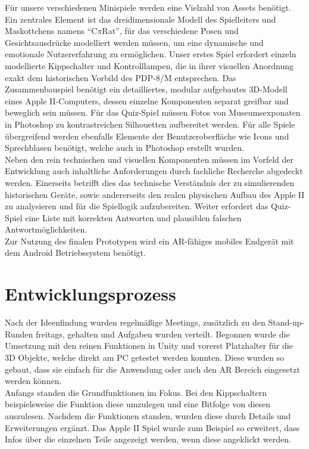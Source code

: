 Für unsere verschiedenen Minispiele werden eine Vielzahl von Assets benötigt. Ein zentrales Element ist das dreidimensionale Modell des Spielleiters und Maskottchens namens “C$\pi$Rat”, für das verschiedene Posen und Gesichtsausdrücke modelliert werden müssen, um eine dynamische und emotionale Nutzererfahrung zu ermöglichen. Unser erstes Spiel erfordert einzeln modellierte Kippschalter und Kontrolllampen, die in ihrer visuellen Anordnung exakt dem historischen Vorbild des PDP-8/M entsprechen. Das Zusammenbauspiel benötigt ein detailliertes, modular aufgebautes 3D-Modell eines Apple II-Computers, dessen einzelne Komponenten separat greifbar und beweglich sein müssen. Für das Quiz-Spiel müssen Fotos von Museumsexponaten in Photoshop zu kontrastreichen Silhouetten aufbereitet werden. Für alle Spiele übergreifend werden ebenfalls Elemente der Benutzeroberfläche wie Icons und Sprechblasen benötigt, welche auch in Photoshop erstellt wurden.\\

Neben den rein technischen und visuellen Komponenten müssen im Vorfeld der Entwicklung auch inhaltliche Anforderungen durch fachliche Recherche abgedeckt werden. Einerseits betrifft dies das technische Verständnis der zu simulierenden historischen Geräte, sowie andererseits den realen physischen Aufbau des Apple II zu analysieren und für die Spiellogik aufzubereiten. Weiter erfordert das Quiz-Spiel eine Liste mit korrekten Antworten und plausiblen falschen Antwortmöglichkeiten.\\

Zur Nutzung des finalen Prototypen wird ein AR-fähiges mobiles Endgerät mit dem Android Betriebssystem benötigt.

\section{Entwicklungsprozess}
Nach der Ideenfindung wurden regelmäßige Meetings, zusätzlich zu den Stand-up-Runden freitags, gehalten und Aufgaben wurden verteilt. Begonnen wurde die Umsetzung mit den reinen Funktionen in Unity und vorerst Platzhalter für die 3D Objekte, welche direkt am PC getestet werden konnten. Diese wurden so gebaut, dass sie einfach für die Anwendung oder auch den AR Bereich eingesetzt werden können.\\ 

Anfangs standen die Grundfunktionen im Fokus. Bei den Kippschaltern beispielsweise die Funktion diese umzulegen und eine Bitfolge von diesen auszulesen. Nachdem die Funktionen standen, wurden diese durch Details und Erweiterungen ergänzt. Das Apple II Spiel wurde zum Beispiel so erweitert, dass Infos über die einzelnen Teile angezeigt werden, wenn diese angeklickt werden.\\ 

